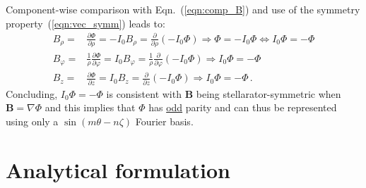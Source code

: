 Component-wise comparison with Eqn.~(\ref{eqn:comp_B}) and use of the symmetry property~(\ref{eqn:vec_symm}) leads to:
\begin{align}
  B_\rho    =& \frac{\partial \Phi}{\partial \rho} = -I_0 B_\rho = \frac{\partial}{\partial \rho} \left( -I_0 \Phi \right) \Rightarrow \Phi = -I_0 \Phi \Leftrightarrow I_0 \Phi = - \Phi \\
  B_\varphi =& \frac{1}{\rho}\frac{\partial \Phi}{\partial \varphi} = I_0 B_\varphi = \frac{1}{\rho} \frac{\partial}{\partial \varphi} \left(- I_0 \Phi \right) \Rightarrow I_0 \Phi = - \Phi \\
  B_z       =& \frac{\partial \Phi}{\partial z} = I_0 B_z = \frac{\partial}{\partial z} \left( -I_0 \Phi \right) \Rightarrow I_0 \Phi = - \Phi \, .
\end{align}
Concluding, $I_0 \Phi = - \Phi$ is consistent with $\mathbf{B}$ being stellarator-symmetric when $\mathbf{B} = \nabla \Phi$
and this implies that $\Phi$ has \underline{odd} parity and can thus be represented using only a $\sin(m\theta-n\zeta)$ Fourier basis.

\FloatBarrier
\section{Analytical formulation}

\FloatBarrier
